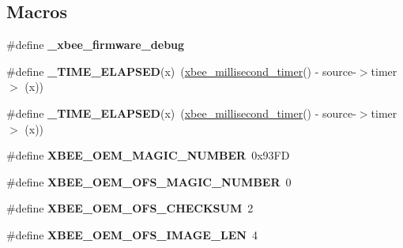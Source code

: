 \subsection*{Macros}
\begin{DoxyCompactItemize}
\item 
\hypertarget{group__xbee__firmware_ga67178b0dd7b917c4416789c1b17931c0}{\#define {\bfseries \-\_\-xbee\-\_\-firmware\-\_\-debug}}\label{group__xbee__firmware_ga67178b0dd7b917c4416789c1b17931c0}

\item 
\hypertarget{group__xbee__firmware_ga89e5bb5d965f258c48d9cea25e67ebd9}{\#define {\bfseries \-\_\-\-T\-I\-M\-E\-\_\-\-E\-L\-A\-P\-S\-E\-D}(x)~(\hyperlink{group__hal_ga22b4e3df788254ca5f8530e9aee58515}{xbee\-\_\-millisecond\-\_\-timer}() -\/ source-\/$>$timer $>$ (x))}\label{group__xbee__firmware_ga89e5bb5d965f258c48d9cea25e67ebd9}

\item 
\hypertarget{group__xbee__firmware_ga89e5bb5d965f258c48d9cea25e67ebd9}{\#define {\bfseries \-\_\-\-T\-I\-M\-E\-\_\-\-E\-L\-A\-P\-S\-E\-D}(x)~(\hyperlink{group__hal_ga22b4e3df788254ca5f8530e9aee58515}{xbee\-\_\-millisecond\-\_\-timer}() -\/ source-\/$>$timer $>$ (x))}\label{group__xbee__firmware_ga89e5bb5d965f258c48d9cea25e67ebd9}

\item 
\hypertarget{group__xbee__firmware_gacc2d97a3340a997e4ac2df44e42d3220}{\#define {\bfseries X\-B\-E\-E\-\_\-\-O\-E\-M\-\_\-\-M\-A\-G\-I\-C\-\_\-\-N\-U\-M\-B\-E\-R}~0x93\-F\-D}\label{group__xbee__firmware_gacc2d97a3340a997e4ac2df44e42d3220}

\item 
\hypertarget{group__xbee__firmware_gab7b27e58766348f7ee11552e19a3dc80}{\#define {\bfseries X\-B\-E\-E\-\_\-\-O\-E\-M\-\_\-\-O\-F\-S\-\_\-\-M\-A\-G\-I\-C\-\_\-\-N\-U\-M\-B\-E\-R}~0}\label{group__xbee__firmware_gab7b27e58766348f7ee11552e19a3dc80}

\item 
\hypertarget{group__xbee__firmware_ga61fbda32638ce4b34b34f9be4e323f69}{\#define {\bfseries X\-B\-E\-E\-\_\-\-O\-E\-M\-\_\-\-O\-F\-S\-\_\-\-C\-H\-E\-C\-K\-S\-U\-M}~2}\label{group__xbee__firmware_ga61fbda32638ce4b34b34f9be4e323f69}

\item 
\hypertarget{group__xbee__firmware_ga30791d99a3f412a18712b68f42f913be}{\#define {\bfseries X\-B\-E\-E\-\_\-\-O\-E\-M\-\_\-\-O\-F\-S\-\_\-\-I\-M\-A\-G\-E\-\_\-\-L\-E\-N}~4}\label{group__xbee__firmware_ga30791d99a3f412a18712b68f42f913be}


\end{DoxyCompactItemize}
